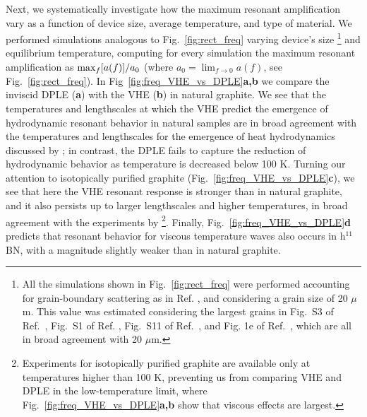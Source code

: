 \documentclass[
prb,
twocolumn,
superscriptaddress,
 amsmath,amssymb,
 aps,
longbibliography,
]{revtex4-2}
\begin{document}
Next, we systematically investigate how the maximum resonant amplification vary as a function of device size, average temperature, and type of material.
We performed simulations analogous to Fig.~\ref{fig:rect_freq} varying device's size \footnote{All the simulations shown in Fig.~\ref{fig:rect_freq} were performed accounting for grain-boundary scattering as in Ref. \cite{Simoncelli2020}, and considering a grain size of 20 $\mu$m.
This value was estimated considering the largest grains in Fig.~S3 of Ref.~\cite{Huberman2019}, Fig.~S1 of Ref. \cite{Jeong2021}, Fig.~S11 of Ref.~\cite{Ding2022}, and Fig. 1e of Ref.~\cite{yuan_modulating_2019}, which are all in broad agreement with 20 $\mu$m.} and equilibrium temperature, computing for every simulation the maximum resonant amplification as ${\rm max}_f[a(f)]/a_0$ (where $a_0{=}\lim_{f{\to} 0}a(f)$, see Fig.~\ref{fig:rect_freq}).
In Fig~\ref{fig:freq_VHE_vs_DPLE}\textbf{a,b} we compare the inviscid DPLE (\textbf{a}) with the VHE (\textbf{b}) in natural graphite. We see that the temperatures and lengthscales at which the VHE predict the emergence of hydrodynamic resonant behavior in natural samples are in broad agreement with the temperatures and lengthscales for the emergence of heat hydrodynamics discussed by \citet{Huberman2019}; in contrast, the DPLE fails to capture the reduction of hydrodynamic behavior as temperature is decreased below 100 K.
Turning our attention to isotopically purified graphite (Fig.~\ref{fig:freq_VHE_vs_DPLE}\textbf{c}), we see that here the VHE resonant response is stronger than in natural graphite, and it also persists up to larger lengthscales and higher temperatures, in broad agreement with the experiments by \citet{Ding2022}\footnote{Experiments \cite{Ding2022} for isotopically purified graphite are available only at temperatures higher than 100 K, preventing us from comparing VHE and DPLE in the low-temperature limit, where Fig.~\ref{fig:freq_VHE_vs_DPLE}\textbf{a,b} show that viscous effects are largest.}.
Finally, Fig.~\ref{fig:freq_VHE_vs_DPLE}\textbf{d} predicts that resonant behavior for viscous temperature waves also occurs in h$^{11}$BN, with a magnitude slightly weaker than in natural graphite.
\end{document}
